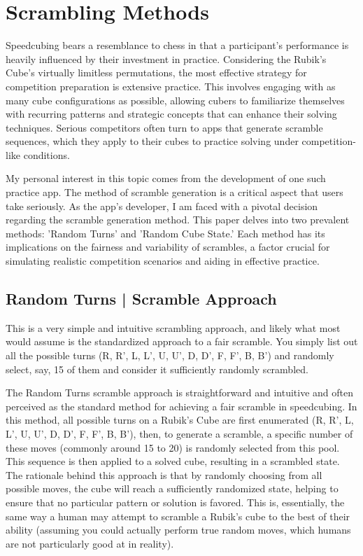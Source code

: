 \documentclass[12pt,letterpaper]{article}
\numberwithin{equation}{section}
\begin{document}
\section{Scrambling Methods}
Speedcubing bears a resemblance to chess in that a participant's performance is heavily influenced by their investment in practice. Considering the Rubik's Cube's virtually limitless permutations, the most effective strategy for competition preparation is extensive practice. This involves engaging with as many cube configurations as possible, allowing cubers to familiarize themselves with recurring patterns and strategic concepts that can enhance their solving techniques. Serious competitors often turn to apps that generate scramble sequences, which they apply to their cubes to practice solving under competition-like conditions.

My personal interest in this topic comes from the development of one such practice app. The method of scramble generation is a critical aspect that users take seriously. As the app's developer, I am faced with a pivotal decision regarding the scramble generation method. This paper delves into two prevalent methods: 'Random Turns' and 'Random Cube State.' Each method has its implications on the fairness and variability of scrambles, a factor crucial for simulating realistic competition scenarios and aiding in effective practice.

\subsection{Random Turns | Scramble Approach}
This is a very simple and intuitive scrambling approach, and likely what most would assume is the standardized approach to a fair scramble. You simply list out all the possible turns (R, R', L, L', U, U', D, D', F, F', B, B') and randomly select, say, 15 of them and consider it sufficiently randomly scrambled. 

The Random Turns scramble approach is straightforward and intuitive and often perceived as the standard method for achieving a fair scramble in speedcubing. In this method, all possible turns on a Rubik's Cube are first enumerated (R, R', L, L', U, U', D, D', F, F', B, B'), then, to generate a scramble, a specific number of these moves (commonly around 15 to 20) is randomly selected from this pool. This sequence is then applied to a solved cube, resulting in a scrambled state. The rationale behind this approach is that by randomly choosing from all possible moves, the cube will reach a sufficiently randomized state, helping to ensure that no particular pattern or solution is favored. This is, essentially, the same way a human may attempt to scramble a Rubik's cube to the best of their ability (assuming you could actually perform true random moves, which humans are not particularly good at in reality).
\end{document}
